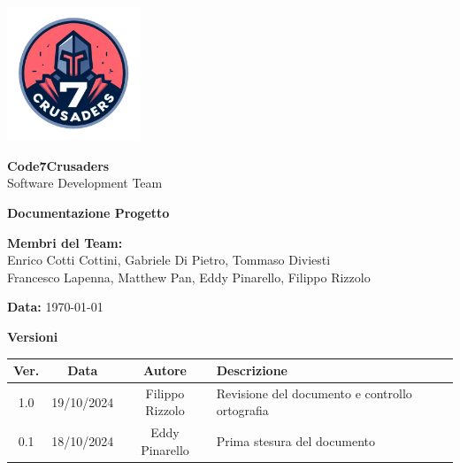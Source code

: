 \documentclass{article}
\begin{document}
\begin{center}
    \vspace*{2cm}
    
    \includegraphics[width=0.3\textwidth]{../../img/logo/7Crusaders_logo.png} %
    \vspace{1cm}
    
    {\Huge \textbf{Code7Crusaders}}\\
    \vspace{0.5cm}
    {\Large Software Development Team}\\
    \vspace{2cm}
    
    {\large \textbf{Documentazione Progetto}}\\
    \vspace{5cm}

    \textbf{Membri del Team:}\\
    Enrico Cotti Cottini, Gabriele Di Pietro, Tommaso Diviesti \\
    Francesco Lapenna, Matthew Pan, Eddy Pinarello, Filippo Rizzolo \\
    \vspace{0.5cm}
    
    {\large \textbf{Data:}} \today\\
    
    \vspace{1cm}
\end{center}

\newpage
\begin{table}[h!]
\centering
\textbf{Versioni} \\ %
\vspace{2mm} %
\begin{tabular}{|c|c|c|l|}
    \hline
    \textbf{Ver.} & \textbf{Data} & \textbf{Autore} & \textbf{Descrizione} \\
    \hline
    1.0 & 19/10/2024 & Filippo Rizzolo & Revisione del documento e controllo ortografia \\ 
    \hline
    0.1 & 18/10/2024 & Eddy Pinarello & Prima stesura del documento \\ 
    \hline
\end{tabular}
\end{table}
\end{document}
